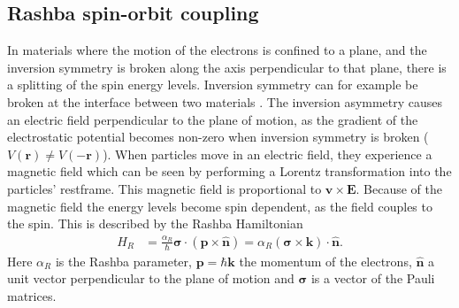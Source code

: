 \documentclass[12pt, a4paper, twoside, openright]{report}
\numberwithin{equation}{chapter}
\numberwithin{figure}{chapter}
\numberwithin{table}{chapter}
\begin{document}
\subsection{Rashba spin-orbit coupling}
In materials where the motion of the electrons is confined to a plane, and the inversion symmetry is broken along the axis perpendicular to that plane, there is a splitting of the spin energy levels. Inversion symmetry can for example be broken at the interface between two materials \cite{Heide2006}. The inversion asymmetry causes an electric field perpendicular to the plane of motion, as the gradient of the electrostatic potential becomes non-zero when inversion symmetry is broken ($V(\mathbold{r}) \neq V(-\mathbold{r})$). When particles move in an electric field, they experience a magnetic field which can be seen by performing a Lorentz transformation into the particles' restframe. This magnetic field is proportional to $\mathbold{v}\times\mathbold{E}$. Because of the magnetic field the energy levels become spin dependent, as the field couples to the spin. This is described by the Rashba Hamiltonian \citep{BychovRashba1984}
\begin{align}
H_R &= \frac{\alpha_R}{\hbar}\mathbold{\sigma}\cdot(\mathbold{p}\times\mathbold{\hat{n}}) = \alpha_R (\mathbold{\sigma}\times\mathbold{k})\cdot\mathbold{\hat{n}}.
\label{eq:RashbaH}
\end{align}
Here $\alpha_R$ is the Rashba parameter, $\mathbold{p} = \hbar\mathbold{k}$ the momentum of the electrons, $\mathbold{\hat{n}}$ a unit vector perpendicular to the plane of motion and $\mathbold{\sigma}$ is a vector of the Pauli matrices.
\end{document}
